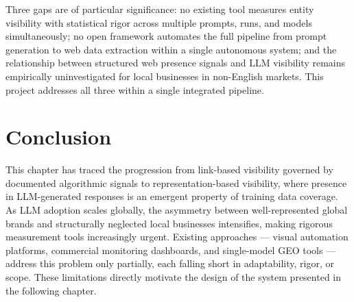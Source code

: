 Three gaps are of particular significance: no existing tool measures entity
visibility with statistical rigor across multiple prompts, runs, and models
simultaneously; no open framework automates the full pipeline from prompt generation
to web data extraction within a single autonomous system; and the relationship
between structured web presence signals and LLM visibility remains empirically
uninvestigated for local businesses in non-English markets. This project addresses
all three within a single integrated pipeline.

\section*{Conclusion}

This chapter has traced the progression from link-based visibility governed by
documented algorithmic signals to representation-based visibility, where presence in
LLM-generated responses is an emergent property of training data coverage. As LLM
adoption scales globally, the asymmetry between well-represented global brands and
structurally neglected local businesses intensifies, making rigorous measurement
tools increasingly urgent. Existing approaches — visual automation platforms,
commercial monitoring dashboards, and single-model GEO tools — address this problem
only partially, each falling short in adaptability, rigor, or scope. These
limitations directly motivate the design of the system presented in the following
chapter.
